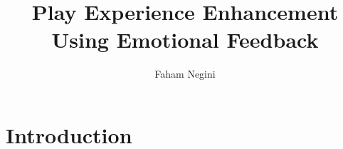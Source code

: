 \documentclass{uofsthesis-cs}
\title{Play Experience Enhancement Using Emotional Feedback}
\author{Faham Negini}
\begin{document}
\maketitle

\frontmatter





\chapter{Introduction}
\label{chap:intro}

\end{document}
